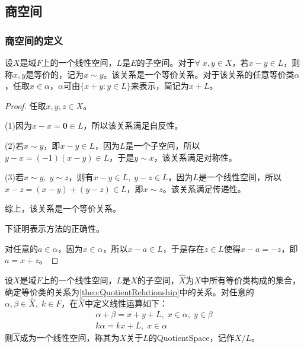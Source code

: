 \subsection{商空间}
\subsubsection{商空间的定义}
\begin{theorem}\label{theo:QuotientRelationship}
	设$X$是域$F$上的一个线性空间，$L$是$E$的子空间。对于$\forall\;x,y\in X$，若$x-y\in L$，则称$x,y$是等价的，记为$x\sim y$。该关系是一个等价关系。对于该关系的任意等价类$\alpha$，任取$x\in\alpha$，$\alpha$可由$\{x+y:y\in L\}$来表示，简记为$x+L$。
\end{theorem}
\begin{proof}
	任取$x,y,z\in X$。\par
	(1)因为$x-x=\mathbf{0}\in L$，所以该关系满足自反性。\par
	(2)若$x\sim y$，即$x-y\in L$，因为$L$是一个子空间，所以$y-x=(-1)(x-y)\in L$，于是$y\sim x$，该关系满足对称性。\par
	(3)若$x\sim y,\;y\sim z$，则有$x-y\in L,\;y-z\in L$，因为$L$是一个线性空间，所以$x-z=(x-y)+(y-z)\in L$，即$x\sim z$。该关系满足传递性。\par
	综上，该关系是一个等价关系。\par
	下证明表示方法的正确性。\par
	对任意的$a\in\alpha$，因为$x\in\alpha$，所以$x-a\in L$，于是存在$z\in L$使得$x-a=-z$，即$a=x+z$。
\end{proof}
\begin{definition}
	设$X$是域$F$上的一个线性空间，$L$是$X$的子空间，$\hat{X}$为$X$中所有等价类构成的集合，确定等价类的关系为\cref{theo:QuotientRelationship}中的关系。对任意的$\alpha,\beta\in\hat{X},\;k\in F$，在$\hat{X}$中定义线性运算如下：
	\begin{gather*}
		\alpha+\beta=x+y+L,\;x\in\alpha,\;y\in\beta \\
		k\alpha=kx+L,\;x\in\alpha
	\end{gather*}
	则$\hat{X}$成为一个线性空间，称其为$X$关于$L$的\gls{QuotientSpace}，记作$X/L$。
\end{definition}
